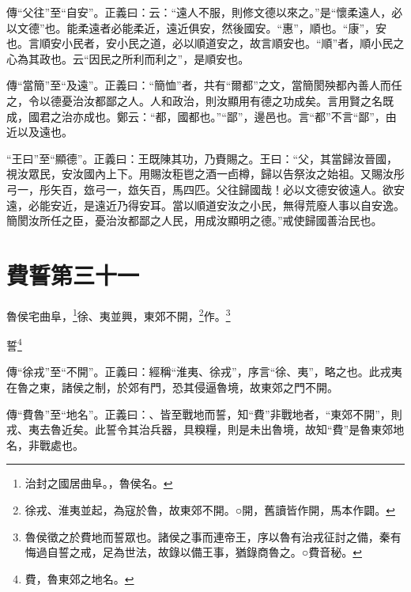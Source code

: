 {\noindent\zhuan{}\fzbyks 傳“父往”至“自安”。正義曰：云：“遠人不服，則修文德以來之。”是“懷柔遠人，必以文德”也。能柔遠者必能柔近，遠近俱安，然後國安。“惠”，順也。“康”，安也。言順安小民者，安小民之道，必以順道安之，故言順安也。“順”者，順小民之心為其政也。云“因民之所利而利之”，是順安也。 \par}

{\noindent\zhuan{}\fzbyks 傳“當簡”至“及遠”。正義曰：“簡恤”者，共有“爾都”之文，當簡閡殃都內善人而任之，令以德憂治汝都鄙之人。人和政治，則汝顯用有德之功成矣。言用賢之名既成，國君之治亦成也。鄭云：“都，國都也。”“鄙”，邊邑也。言“都”不言“鄙”，由近以及遠也。 \par}

{\noindent\shu{}\fzkt “王曰”至“顯德”。正義曰：王既陳其功，乃賚賜之。王曰：“父，其當歸汝晉國，視汝眾民，安汝國內上下。用賜汝秬鬯之酒一卣樽，歸以告祭汝之始祖。又賜汝彤弓一，彤矢百，玈弓一，玈矢百，馬四匹。父往歸國哉！必以文德安彼遠人。欲安遠，必能安近，是遠近乃得安耳。當以順道安汝之小民，無得荒廢人事以自安逸。簡閡汝所任之臣，憂治汝都鄙之人民，用成汝顯明之德。”戒使歸國善治民也。 \par}

\section{費誓第三十一}


魯侯宅曲阜，\footnote{治封之國居曲阜。，魯侯名。}徐、夷並興，東郊不開，\footnote{徐戎、淮夷並起，為寇於魯，故東郊不開。○開，舊讀皆作開，馬本作闢。}作。\footnote{魯侯徵之於費地而誓眾也。諸侯之事而連帝王，序以魯有治戎征討之備，秦有悔過自誓之戒，足為世法，故錄以備王事，猶錄商魯之。○費音秘。}

誓\footnote{費，魯東郊之地名。}


{\noindent\zhuan{}\fzbyks 傳“徐戎”至“不開”。正義曰：經稱“淮夷、徐戎”，序言“徐、夷”，略之也。此戎夷在魯之東，諸侯之制，於郊有門，恐其侵逼魯境，故東郊之門不開。 \par}

{\noindent\zhuan{}\fzbyks 傳“費魯”至“地名”。正義曰：、皆至戰地而誓，知“費”非戰地者，“東郊不開”，則戎、夷去魯近矣。此誓令其治兵器，具糗糧，則是未出魯境，故知“費”是魯東郊地名，非戰處也。 \par}

